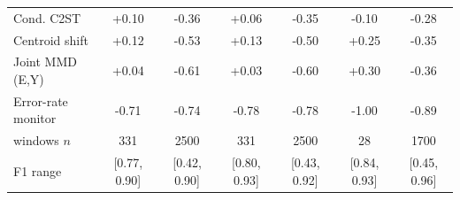\begin{tabular}{lcccccc}
Cond. C2ST & \makecell{+0.10\\{\cifont[-0.02, +0.21]}} & \makecell{-0.36\\{\cifont[-0.40, -0.32]}} & \makecell{+0.06\\{\cifont[-0.05, +0.17]}} & \makecell{-0.35\\{\cifont[-0.39, -0.32]}} & \makecell{-0.10\\{\cifont[-0.49, +0.29]}} & \makecell{-0.28\\{\cifont[-0.33, -0.23]}} \\
Centroid shift & \makecell{+0.12\\{\cifont[+0.01, +0.23]}} & \makecell{-0.53\\{\cifont[-0.57, -0.49]}} & \makecell{+0.13\\{\cifont[+0.02, +0.23]}} & \makecell{-0.50\\{\cifont[-0.53, -0.47]}} & \makecell{+0.25\\{\cifont[-0.14, +0.61]}} & \makecell{-0.35\\{\cifont[-0.40, -0.30]}} \\
Joint MMD (E,Y) & \makecell{+0.04\\{\cifont[-0.07, +0.15]}} & \makecell{-0.61\\{\cifont[-0.63, -0.58]}} & \makecell{+0.03\\{\cifont[-0.09, +0.14]}} & \makecell{-0.60\\{\cifont[-0.63, -0.58]}} & \makecell{+0.30\\{\cifont[-0.07, +0.61]}} & \makecell{-0.36\\{\cifont[-0.40, -0.32]}} \\
Error-rate monitor & \makecell{-0.71\\{\cifont[-0.77, -0.64]}} & \makecell{-0.74\\{\cifont[-0.77, -0.71]}} & \makecell{-0.78\\{\cifont[-0.82, -0.73]}} & \makecell{-0.78\\{\cifont[-0.81, -0.75]}} & \makecell{-1.00\\{\cifont[-1.00, -0.99]}} & \makecell{-0.89\\{\cifont[-0.91, -0.87]}} \\
\midrule
windows $n$ & 331 & 2500 & 331 & 2500 & 28 & 1700 \\
F1 range & [0.77, 0.90] & [0.42, 0.90] & [0.80, 0.93] & [0.43, 0.92] & [0.84, 0.93] & [0.45, 0.96] \\
\bottomrule
\end{tabular}